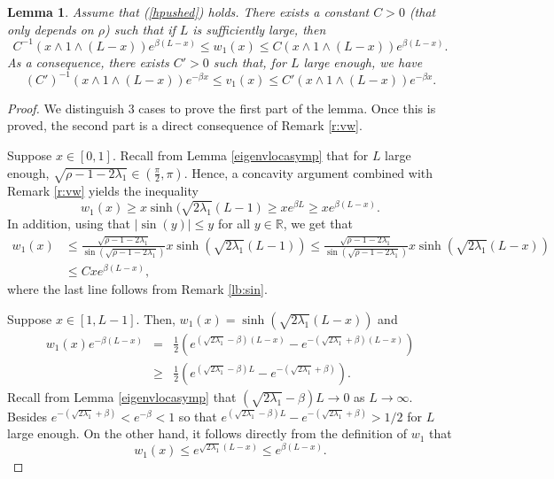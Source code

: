 \documentclass[11pt]{article}
\theoremstyle{plain}
\newtheorem{lemma}{Lemma}[section]
\begin{document}
\begin{lemma}\label{ubv1} 
Assume that (\ref{hpushed}) holds. There exists a constant $C>0$ (that only depends on $\rho$) such that if $L$ is sufficiently large, then
\begin{equation*}
   C^{-1}(x\wedge 1\wedge(L-x)) e^{\beta(L-x)} \leqslant  w_1(x)\leqslant C(x\wedge 1\wedge(L-x)) e^{\beta(L-x)}.
\end{equation*}
As a consequence, there exists $C'>0$ such that, for $L$ large enough, we have
\begin{equation*}
   (C')^{-1}(x\wedge 1\wedge (L-x))e^{-\beta x}\leqslant v_1(x)\leqslant C'(x\wedge 1\wedge (L-x))e^{-\beta x}.
\end{equation*}
\end{lemma}

\begin{proof}
We distinguish $3$ cases to prove the first part of the lemma. Once this is proved, the second part is a direct consequence of Remark \ref{r:vw}.

 Suppose $x\in[0,1]$. Recall from Lemma \ref{eigenvlocasymp} that for $L$ large enough, $\sqrt{\rho-1-2\lambda_1}\in\left(\frac{\pi}{2},\pi\right)$. Hence, a concavity argument combined with Remark \ref{r:vw} yields the inequality 
\begin{equation*}
w_1(x)\geqslant x \sinh(\sqrt{2\lambda_1}(L-1) \geqslant xe^{\beta L}\geqslant xe^{\beta (L-x)}.
\end{equation*}
In addition, using that $|\sin(y)|\leqslant y$ for all $y\in \mathbb{R}$, we get that 
\begin{align*}
w_1(x)&\leqslant \frac{\sqrt{\rho-1-2\lambda_1}}{\sin(\sqrt{\rho-1-2\lambda_1})} x \sinh(\sqrt{2\lambda_1}(L-1))\leqslant  \frac{\sqrt{\rho-1-2\lambda_1}}{\sin(\sqrt{\rho-1-2\lambda_1})} x \sinh(\sqrt{2\lambda_1}(L-x))\\
&\leqslant C x e^{\beta (L-x)},                 
\end{align*}
where the last line follows from Remark \ref{lb:sin}.

Suppose $x\in[1,L-1]$. Then, $w_1(x)=\sinh(\sqrt{2\lambda_1}(L-x))$ and 
\begin{eqnarray*}
w_1(x)e^{-\beta(L-x)}&=&\frac{1}{2}\left(e^{(\sqrt{2\lambda_1}-\beta)(L-x)}-e^{-(\sqrt{2\lambda_1}+\beta)(L-x)}\right)\\&\geqslant&\frac{1}{2}\left(e^{(\sqrt{2\lambda_1}-\beta)L}-e^{-(\sqrt{2\lambda_1}+\beta)}\right).
\end{eqnarray*} Recall from Lemma \ref{eigenvlocasymp} that $(\sqrt{2\lambda_1}-\beta)L\to0$ as $L\to \infty$. Besides $e^{-(\sqrt{2\lambda_1}+\beta)}<e^{-\beta }<1$ so that $e^{(\sqrt{2\lambda_1}-\beta)L}-e^{-(\sqrt{2\lambda_1}+\beta)}>1/2$ for $L$ large enough. On the other hand, it follows directly from the definition of $w_1$ that 
\begin{equation*}
w_1(x)\leqslant e^{\sqrt{2\lambda_1}(L-x)}\leqslant e^{\beta (L-x)}.
\end{equation*}


\end{proof}
\end{document}
